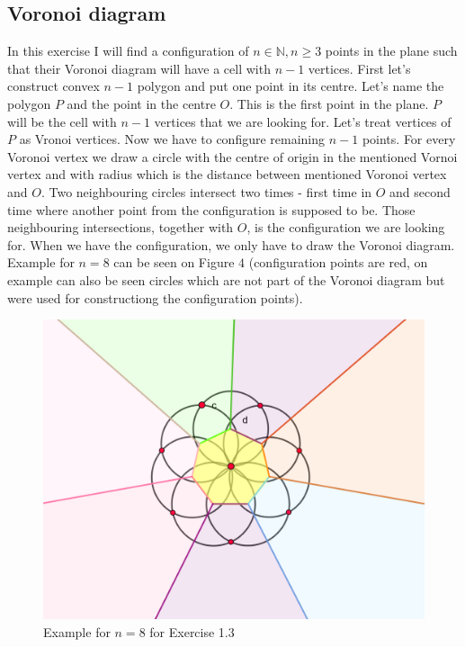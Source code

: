 \documentclass[12pt]{article}
\begin{document}
	\subsection{Voronoi diagram} In this exercise I will find a configuration of $n \in \mathbb{N}, n \geq 3$ points in the plane such that their Voronoi diagram will have a cell with $n-1$ vertices. First let's construct convex $n-1$ polygon and put one point in its centre. Let's name the polygon $P$ and the point in the centre $O$. This is the first point in the plane. $P$ will be the cell with $n-1$ vertices that we are looking for. Let's treat vertices of $P$ as Vronoi vertices.  Now we have to configure remaining $n-1$ points. For every Voronoi vertex we draw a circle with the centre of origin in the mentioned Vornoi vertex and with radius which is the distance between mentioned Voronoi vertex and $O$. Two neighbouring circles intersect two times - first time in $O$ and second time where another point from the configuration is supposed to be. Those neighbouring intersections, together with $O$, is the configuration we are looking for. When we have  the configuration, we only have to draw the Voronoi diagram. Example for $n=8$ can be seen on Figure $4$ (configuration points are red, on example can also be seen circles which are not part of the Voronoi diagram but were used for constructiong the configuration points).
	
	\begin{figure}
		\centering
		\includegraphics[scale=0.20] {graf2}
		\caption{\label{fig:4} Example for $n=8$ for Exercise 1.3 }
	\end{figure}
\end{document}
